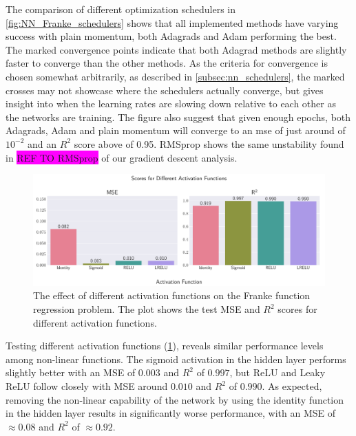 The comparison of different optimization schedulers in \cref{fig:NN_Franke_schedulers} shows that all implemented methods have varying success with plain momentum, both Adagrads and Adam performing the best. The marked convergence points indicate that both Adagrad methods are slightly faster to converge than the other methods. As the criteria for convergence is chosen somewhat arbitrarily, as described in \cref{subsec:nn_schedulers}, the marked crosses may not showcase where the schedulers actually converge, but gives insight into when the learning rates are slowing down relative to each other as the networks are training. The figure also suggest that given enough epochs, both Adagrads, Adam and plain momentum will converge to an mse of just around of \( 10^{-2} \) and an \( R^2 \) score above of 0.95. RMSprop shows the same unstability found in \colorbox{magenta}{REF TO RMSprop} of our gradient descent analysis.

\onecolumngrid
\begin{figure}[h!]
    \begin{minipage}{\textwidth}
        \centering
        \includegraphics[width = .9\textwidth]{../figs/c_activation_funcs.pdf}
        \caption{The effect of different activation functions on the Franke function regression problem. The plot shows the test MSE and \( R^2 \) scores for different activation functions.}
        \label{fig:NN_Franke_activation}
    \end{minipage}
\end{figure}
\twocolumngrid

Testing different activation functions (\cref{fig:NN_Franke_activation}), reveals similar performance levels among non-linear functions. The sigmoid activation in the hidden layer performs slightly better with an MSE of $0.003$ and $R^2$ of $0.997$, but ReLU and Leaky ReLU follow closely with MSE around $0.010$ and $R^2$ of $0.990$. As expected, removing the non-linear capability of the network by using the identity function in the hidden layer results in significantly worse performance, with an MSE of $\approx0.08$ and $R^2$ of $\approx0.92$.


